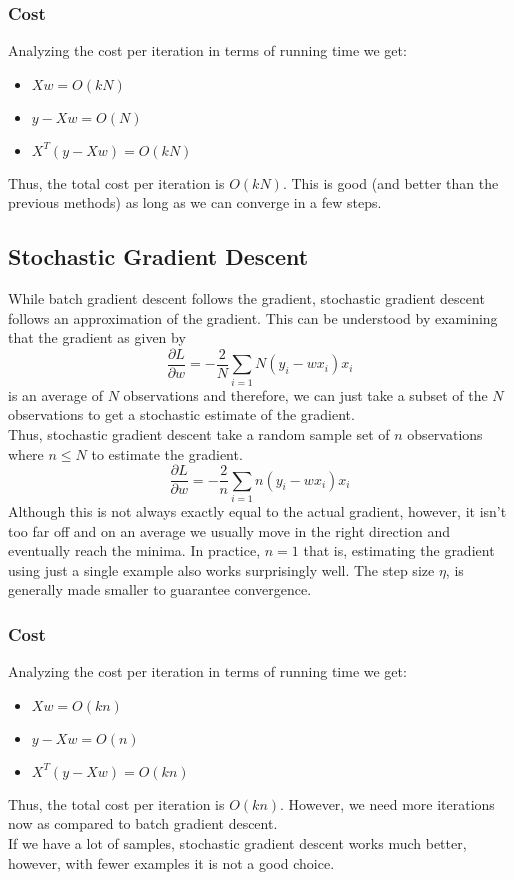 \subsubsection{Cost}
Analyzing the cost per iteration in terms of running time we get:
\begin{itemize}
\item $Xw=O(kN)$
\item $y-Xw=O(N)$
\item $X^{T}(y-Xw)=O(kN)$
\end{itemize}
Thus, the total cost per iteration is $O(kN)$. This is good (and better than the previous methods) as long as we can converge in a few steps. 
\subsection{Stochastic Gradient Descent}
While batch gradient descent follows the gradient, stochastic gradient descent follows an approximation of the gradient. This can be understood by examining that the gradient as given by
\begin{equation}
\frac{\partial L}{\partial w}=-\frac{2}{N} \sum_{i=1}{N}{(y_{i}-wx_{i})x_{i}}
\end{equation}
is an average of $N$ observations and therefore, we can just take a subset of the $N$ observations to get a stochastic estimate of the gradient.  
\\Thus, stochastic gradient descent take a random sample set of $n$ observations where $n \leq N$ to estimate the gradient. 
\begin{equation}
\frac{\partial L}{\partial w}=-\frac{2}{n} \sum_{i=1}{n}{(y_{i}-wx_{i})x_{i}}
\end{equation}
Although this is not always exactly equal to the actual gradient, however, it isn't too far off and on an average we usually move in the right direction and eventually reach the minima. In practice, $n=1$ that is, estimating the gradient using just a single example also works surprisingly well. The step size $\eta$, is generally made smaller to guarantee convergence. 
\subsubsection{Cost}
Analyzing the cost per iteration in terms of running time we get:
\begin{itemize}
\item $Xw=O(kn)$
\item $y-Xw=O(n)$
\item $X^{T}(y-Xw)=O(kn)$
\end{itemize}
Thus, the total cost per iteration is $O(kn)$. However, we need more iterations now as compared to batch gradient descent.  
\\ If we have a lot of samples, stochastic gradient descent works much better, however, with fewer examples it is not a good choice. 
